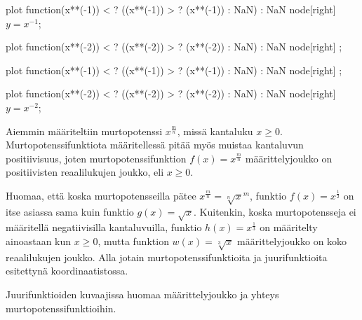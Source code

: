 
\begin{center}
\begin{kuvaajapohja}{0.5}{-6}{6}{-6}{6}
\newcommand{\kuvaajaneg}[3]{
\draw[smooth,color=#3,thick,domain=\kuvaajaminx:-0.01,scale=\kuvaajascale,samples=300] plot function{(#1) < \kuvaajamaxy ? ((#1) > \kuvaajaminy ? (#1) : NaN) : NaN} node[right] {#2};
}
\newcommand{\kuvaajapos}[3]{
\draw[smooth,color=#3,thick,domain=0.01:\kuvaajamaxx,scale=\kuvaajascale,samples=300] plot function{(#1) < \kuvaajamaxy ? ((#1) > \kuvaajaminy ? (#1) : NaN) : NaN} node[right] {#2};
}
\kuvaajaneg{x**(-1)}{$y=x^{-1}$}{red}
\kuvaajaneg{x**(-2)}{}{blue}

\kuvaajapos{x**(-1)}{}{red}
\kuvaajapos{x**(-2)}{$y=x^{-2}$}{blue}

\end{kuvaajapohja}
\end{center}

Aiemmin määriteltiin murtopotenssi $x^{\frac{m}{n}}$, missä kantaluku $x\geq0$. Murtopotenssifunktiota määritellessä pitää myös muistaa kantaluvun positiivisuus, 
joten murtopotenssifunktion $f(x)=x^{\frac{m}{n}}$ määrittelyjoukko on positiivisten reaalilukujen joukko, eli $x\geq0$.

Huomaa, että koska murtopotensseilla pätee $x^{\frac{m}{n}}={\sqrt[n]{x}}^m$, funktio $f(x)=x^{\frac{1}{2}}$ on itse asiassa sama kuin funktio $g(x)=\sqrt{x}$.
Kuitenkin, koska murtopotensseja ei määritellä negatiivisilla kantaluvuilla, funktio $h(x)=x^{\frac{1}{3}}$ on määritelty ainoastaan kun $x\geq0$, mutta funktion
$w(x)=\sqrt[3]{x}$ määrittelyjoukko on koko reaalilukujen joukko. Alla jotain murtopotenssifunktioita ja juurifunktioita esitettynä koordinaatistossa.

\begin{center}
	\begin{kuvaajapohja}{1.0}{-3}{3}{-3}{3}
	\end{kuvaajapohja}
\end{center}

Juurifunktioiden kuvaajissa huomaa määrittelyjoukko ja yhteys murtopotenssifunktioihin.

